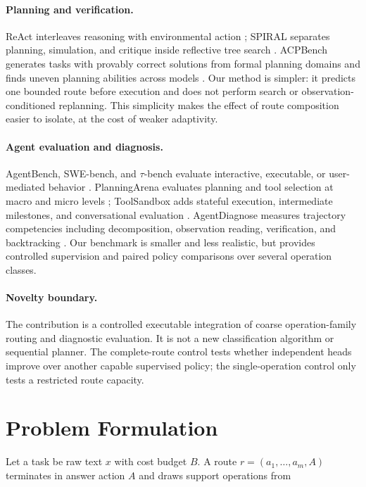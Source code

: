 \documentclass[letterpaper]{article} %
\begin{document}
\paragraph{Planning and verification.}
ReAct interleaves reasoning with environmental action \citep{yao2023react}; SPIRAL separates planning, simulation, and critique inside reflective tree search \citep{zhang2026spiral}. ACPBench generates tasks with provably correct solutions from formal planning domains and finds uneven planning abilities across models \citep{kokel2025acpbench}. Our method is simpler: it predicts one bounded route before execution and does not perform search or observation-conditioned replanning. This simplicity makes the effect of route composition easier to isolate, at the cost of weaker adaptivity.

\paragraph{Agent evaluation and diagnosis.}
AgentBench, SWE-bench, and $\tau$-bench evaluate interactive, executable, or user-mediated behavior \citep{liu2024agentbench,jimenez2024swebench,yao2024taubench}. PlanningArena evaluates planning and tool selection at macro and micro levels \citep{zheng2025planningarena}; ToolSandbox adds stateful execution, intermediate milestones, and conversational evaluation \citep{lu2025toolsandbox}. AgentDiagnose measures trajectory competencies including decomposition, observation reading, verification, and backtracking \citep{ou2025agentdiagnose}. Our benchmark is smaller and less realistic, but provides controlled supervision and paired policy comparisons over several operation classes.

\paragraph{Novelty boundary.}
The contribution is a controlled executable integration of coarse operation-family routing and diagnostic evaluation. It is not a new classification algorithm or sequential planner. The complete-route control tests whether independent heads improve over another capable supervised policy; the single-operation control only tests a restricted route capacity.

\section{Problem Formulation}

Let a task be raw text $x$ with cost budget $B$. A route $r=(a_1,\ldots,a_m,A)$ terminates in answer action $A$ and draws support operations from
\end{document}
